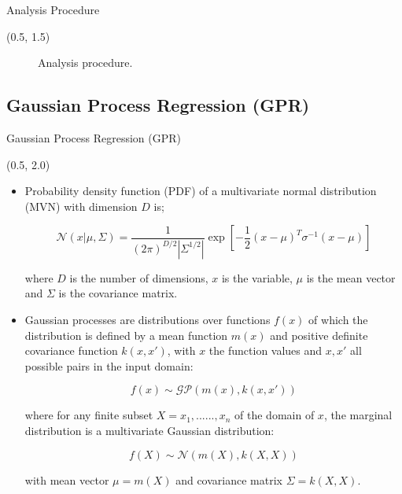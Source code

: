 \documentclass[10pt, xcolor={dvipsnames}, aspectratio = 169]{beamer}
\begin{document}
\begin{frame}{Analysis Procedure}

\begin{textblock}{14.0}(0.5, 1.5)

\begin{figure}
    \centering
    
    \caption{Analysis procedure.}
\end{figure}

\end{textblock}

\end{frame}


%
%

\subsection{Gaussian Process Regression (GPR)}

\begin{frame}[fragile]{Gaussian Process Regression (GPR)}

\begin{textblock}{14.0}(0.5, 2.0)

\begin{itemize}

\item Probability density function (PDF) of a multivariate normal distribution (MVN) with dimension $D$ is;

\begin{equation*}
\mathcal{N} (x| \mu, \Sigma) = \frac{1}{(2\pi)^{D/2} |\Sigma^{1/2}|} \exp\left[ -\frac{1}{2}(x - \mu)^{T}\sigma^{-1}(x - \mu)\right]
\end{equation*}

where $D$ is the number of dimensions, $x$ is the variable, $\mu$ is the mean vector and $\Sigma$ is the covariance matrix.

\item Gaussian processes are distributions over functions $f(x)$ of which the distribution is defined by a mean function $m(x)$ and positive definite covariance function $k(x, x')$, with $x$ the function values and $x, x'$ all possible pairs in the input domain:

\begin{equation*}
    f(x) \sim \mathcal{G}\mathcal{P}(m(x), k(x, x'))
\end{equation*}

where for any finite subset $X = {x_{1}, ......, x_{n}}$ of the domain of $x$, the marginal distribution is a multivariate Gaussian distribution:

\begin{equation*}
f(X) \sim \mathcal{N}(m(X), k(X, X))
\end{equation*}

with mean vector $\mu = m(X)$ and covariance matrix $\Sigma = k(X, X)$.

\end{itemize}

\end{textblock}

\end{frame}
\end{document}
